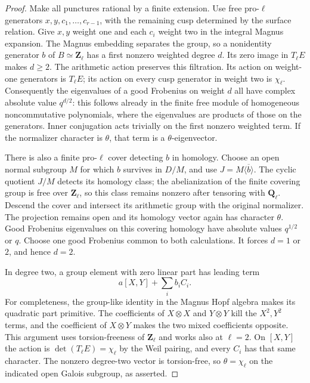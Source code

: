 \documentclass[11pt,oneside]{article}
\begin{document}
\begin{proof}
Make all punctures rational by a finite extension.
Use free pro-$\ell$ generators $x,y,c_1,\ldots,c_{r-1}$,
with the remaining cusp determined by the surface
relation.  Give $x,y$ weight one and each $c_i$
weight two in the integral Magnus expansion.  The
Magnus embedding separates the group, so a nonidentity
generator $b$ of $B\simeq\mathbf Z_\ell$ has a
first nonzero weighted degree $d$.  Its zero image in
$T_\ell E$ makes $d\ge2$.  The arithmetic action
preserves this filtration.  Its action on weight-one
generators is $T_\ell E$; its action on every cusp
generator in weight two is $\chi_\ell$.  Consequently
the eigenvalues of a good Frobenius on weight $d$
all have complex absolute value $q^{d/2}$: this
follows already in the finite free module of
homogeneous noncommutative polynomials, where the
eigenvalues are products of those on the generators.
Inner conjugation acts trivially on the first
nonzero weighted term.  If the normalizer character
is $\theta$, that term is a $\theta$-eigenvector.

There is also a finite pro-$\ell$ cover detecting
$b$ in homology.  Choose an open normal subgroup
$M$ for which $b$ survives in $D/M$, and use
$J=M\overline{\langle b\rangle}$.  The cyclic
quotient $J/M$ detects its homology class; the
abelianization of the finite covering group is free
over $\mathbf Z_\ell$, so this class remains
nonzero after tensoring with $\mathbf Q_\ell$.
Descend the cover and intersect its arithmetic group
with the original normalizer.  The projection remains
open and its homology vector again has character
$\theta$.  Good Frobenius eigenvalues on this covering
homology have absolute values $q^{1/2}$ or $q$.
Choose one good Frobenius common to both calculations.
It forces $d=1$ or $2$, and hence $d=2$.

In degree two, a group element with zero linear part
has leading term
\[
                a[X,Y]+\sum_i b_i C_i.
\]
For completeness, the group-like identity in the
Magnus Hopf algebra makes its quadratic part primitive.
The coefficients of $X\otimes X$ and $Y\otimes Y$
kill the $X^2,Y^2$ terms, and the coefficient of
$X\otimes Y$ makes the two mixed coefficients
opposite.  This argument uses torsion-freeness of
$\mathbf Z_\ell$ and works also at $\ell=2$.
On $[X,Y]$ the action is
$\det(T_\ell E)=\chi_\ell$ by the Weil pairing,
and every $C_i$ has that same character.  The
nonzero degree-two vector is torsion-free, so
$\theta=\chi_\ell$ on the indicated open Galois
subgroup, as asserted.
\end{proof}
\end{document}
